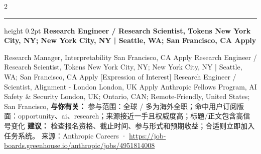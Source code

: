 \documentclass[10.5pt]{ctexart}
\begin{document}
\begin{multicols}{2}
\vspace{2mm}
\hrule height 0.2pt
\vspace{2mm}
{\large\bfseries Research Engineer / Research Scientist, Tokens New York City, NY; New York City, NY | Seattle, WA; San Francisco, CA Apply}\par
[Expression of Interest] Research Manager, Interpretability San Francisco, CA Apply Research Engineer / Research Scientist, Tokens New York City, NY; New York City, NY | Seattle, WA; San Francisco, CA Apply [Expression of Interest] Research Engineer / Scientist, Alignment - London London, UK Apply Anthropic Fellows Program, AI Safety \& Security London, UK; Ontario, CAN; Remote-Friendly, United States; San Francisco, 
\textbf{与你有关：} 参与范围：全球 / 多为海外全职；命中用户订阅版面：opportunity、ai、research；来源接近一手且权威度高；标题/正文包含高信号变化
\textbf{建议：} 检查报名资格、截止时间、参与形式和预期收益；合适则立即加入任务系统。
{\footnotesize\color{ormuted} 来源：Anthropic Careers · \url{https://job-boards.greenhouse.io/anthropic/jobs/4951814008}}
\end{multicols}
\end{document}
